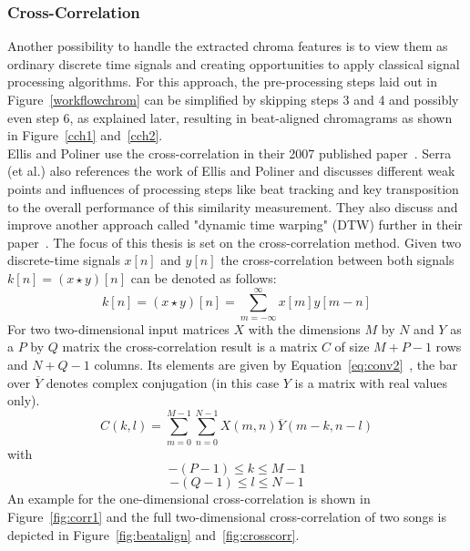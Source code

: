 \subsubsection{Cross-Correlation}\label{crosscorrsec}

Another possibility to handle the extracted chroma features is to view them as ordinary discrete time signals and creating opportunities to apply classical signal processing algorithms. For this approach, the pre-processing steps laid out in Figure~\ref{workflowchrom} can be simplified by skipping steps 3 and 4 and possibly even step 6, as explained later, resulting in beat-aligned chromagrams as shown in Figure~\ref{cch1} and~\ref{cch2}.\\
Ellis and Poliner use the cross-correlation in their 2007 published paper~\cite{chroma3}. Serra (et al.) also references the work of Ellis and Poliner and discusses different weak points and influences of processing steps like beat tracking and key transposition to the overall performance of this similarity measurement. 
They also discuss and improve another approach called "dynamic time warping" (DTW) further in their paper~\cite{chroma2}. The focus of this thesis is set on the cross-correlation method. 
Given two discrete-time signals $x[n]$ and $y[n]$ the cross-correlation between both signals $k[n] = (x \star y)[n]$ can be denoted as follows:
\begin{equation} \label{eq:conv1}
k[n] = (x \star y)[n] = \sum_{m = -\infty}^{\infty}{x[m] y[m - n]} 
\end{equation}
For two two-dimensional input matrices $X$ with the dimensions $M$ by $N$ and $Y$ as a $P$ by $Q$ matrix the cross-correlation result is a matrix $C$ of size $M + P - 1$ rows and $N + Q - 1$ columns. Its elements are given by Equation~\eqref{eq:conv2}~\cite{mathcorr}, the bar over $\overline{Y}$ denotes complex conjugation (in this case $Y$ is a matrix with real values only). 
\begin{equation} \label{eq:conv2}
C(k, l) = \sum_{m = 0}^{M - 1}{\sum_{n = 0}^{N - 1}{X(m, n)\overline{Y}(m - k, n - l)}}
\end{equation}
with 
\begin{equation} \label{eq:conv3}
-(P - 1) \leq k \leq M - 1
\end{equation}
\begin{equation} \label{eq:conv4}
-(Q - 1) \leq l \leq N - 1
\end{equation}
An example for the one-dimensional cross-correlation is shown in Figure~\ref{fig:corr1} and the full two-dimensional cross-correlation of two songs is depicted in Figure~\ref{fig:beatalign} and~\ref{fig:crosscorr}.
